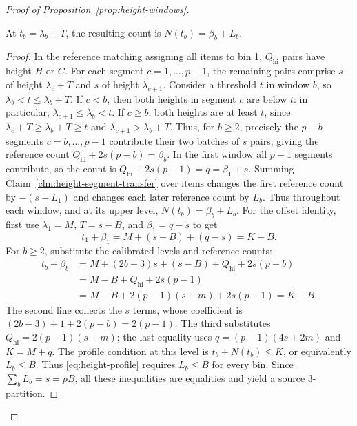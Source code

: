 \begin{proof}[Proof of Proposition~\ref{prop:height-windows}]
\begin{claim}
\label{clm:height-bin-counts}
At $t_b=\lambda_b+T$, the resulting count is $N(t_b)=\beta_b+L_b$.
\end{claim}
\begin{proof}
In the reference matching assigning all items to bin 1,
$Q_{\mathrm{hi}}$ pairs have height $H$ or $C$.
For each segment $c=1,\ldots,p-1$, the remaining pairs comprise
$s$ of height $\lambda_c+T$ and $s$ of height $\lambda_{c+1}$.
Consider a threshold $t$ in window $b$, so
$\lambda_b<t\le\lambda_b+T$. If $c<b$, then both heights in
segment $c$ are below $t$: in particular,
$\lambda_{c+1}\le\lambda_b<t$. If $c\ge b$, both heights are
at least $t$, since $\lambda_c+T\ge\lambda_b+T\ge t$ and
$\lambda_{c+1}>\lambda_b+T$. Thus, for $b\ge2$, precisely the
$p-b$ segments $c=b,\ldots,p-1$ contribute their two batches of
$s$ pairs, giving the reference count
$Q_{\mathrm{hi}}+2s(p-b)=\beta_b$. In the first window all
$p-1$ segments contribute, so the count is
$Q_{\mathrm{hi}}+2s(p-1)=q=\beta_1+s$.
Summing Claim~\ref{clm:height-segment-transfer} over items changes the first reference count
by $-(s-L_1)$ and changes each later reference count by $L_b$.
Thus throughout each window, and at its upper level,
$N(t_b)=\beta_b+L_b$. For the offset identity, first use
$\lambda_1=M$, $T=s-B$, and $\beta_1=q-s$ to get
\[
 t_1+\beta_1=M+(s-B)+(q-s)=K-B.
\]
For $b\ge2$, substitute the calibrated levels and reference counts:
\begin{align*}
 t_b+\beta_b
 &=M+(2b-3)s+(s-B)+Q_{\mathrm{hi}}+2s(p-b)\\
 &=M-B+Q_{\mathrm{hi}}+2s(p-1)\\
 &=M-B+2(p-1)(s+m)+2s(p-1)=K-B.
\end{align*}
The second line collects the $s$ terms, whose coefficient is
$(2b-3)+1+2(p-b)=2(p-1)$. The third substitutes
$Q_{\mathrm{hi}}=2(p-1)(s+m)$; the last equality uses
$q=(p-1)(4s+2m)$ and $K=M+q$.
The profile condition at this level is
$t_b+N(t_b)\le K$, or equivalently $L_b\le B$.
Thus \eqref{eq:height-profile} requires $L_b\le B$ for every bin.
Since $\sum_b L_b=s=pB$, all these inequalities are equalities
and yield a source 3-partition.
\end{proof}
\end{proof}

